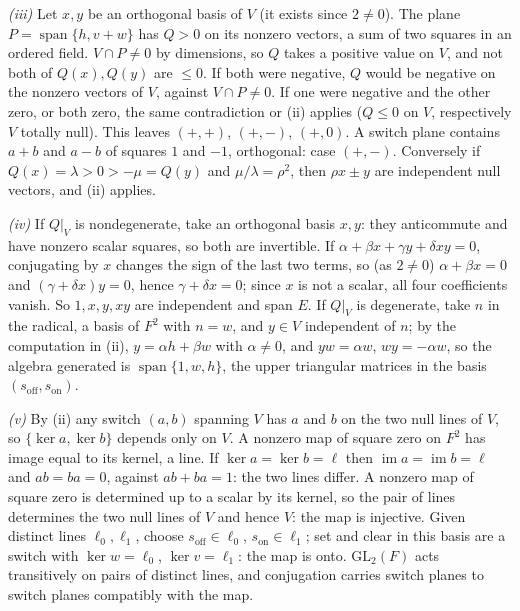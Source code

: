 \emph{(iii)} Let $x, y$ be an orthogonal basis of $V$ (it exists since $2 \ne 0$). The plane $P = \operatorname{span}\{h, v + w\}$ has $Q > 0$ on its nonzero vectors, a sum of two squares in an ordered field. $V \cap P \ne 0$ by dimensions, so $Q$ takes a positive value on $V$, and not both of $Q(x), Q(y)$ are $\le 0$. If both were negative, $Q$ would be negative on the nonzero vectors of $V$, against $V \cap P \ne 0$. If one were negative and the other zero, or both zero, the same contradiction or (ii) applies ($Q \le 0$ on $V$, respectively $V$ totally null). This leaves $(+,+)$, $(+,-)$, $(+,0)$. A switch plane contains $a + b$ and $a - b$ of squares $1$ and $-1$, orthogonal: case $(+,-)$. Conversely if $Q(x) = \lambda > 0 > -\mu = Q(y)$ and $\mu/\lambda = \rho^{2}$, then $\rho x \pm y$ are independent null vectors, and (ii) applies.

\emph{(iv)} If $Q|_{V}$ is nondegenerate, take an orthogonal basis $x, y$: they anticommute and have nonzero scalar squares, so both are invertible. If $\alpha + \beta x + \gamma y + \delta xy = 0$, conjugating by $x$ changes the sign of the last two terms, so (as $2 \ne 0$) $\alpha + \beta x = 0$ and $(\gamma + \delta x)y = 0$, hence $\gamma + \delta x = 0$; since $x$ is not a scalar, all four coefficients vanish. So $1, x, y, xy$ are independent and span $E$. If $Q|_{V}$ is degenerate, take $n$ in the radical, a basis of $F^{2}$ with $n = w$, and $y \in V$ independent of $n$; by the computation in (ii), $y = \alpha h + \beta w$ with $\alpha \ne 0$, and $yw = \alpha w$, $wy = -\alpha w$, so the algebra generated is $\operatorname{span}\{1, w, h\}$, the upper triangular matrices in the basis $(s_{\mathrm{off}}, s_{\mathrm{on}})$.

\emph{(v)} By (ii) any switch $(a, b)$ spanning $V$ has $a$ and $b$ on the two null lines of $V$, so $\{\ker a, \ker b\}$ depends only on $V$. A nonzero map of square zero on $F^{2}$ has image equal to its kernel, a line. If $\ker a = \ker b = \ell$ then $\operatorname{im}a = \operatorname{im}b = \ell$ and $ab = ba = 0$, against $ab + ba = 1$: the two lines differ. A nonzero map of square zero is determined up to a scalar by its kernel, so the pair of lines determines the two null lines of $V$ and hence $V$: the map is injective. Given distinct lines $\ell_{0}, \ell_{1}$, choose $s_{\mathrm{off}} \in \ell_{0}$, $s_{\mathrm{on}} \in \ell_{1}$; set and clear in this basis are a switch with $\ker w = \ell_{0}$, $\ker v = \ell_{1}$: the map is onto. $\mathrm{GL}_{2}(F)$ acts transitively on pairs of distinct lines, and conjugation carries switch planes to switch planes compatibly with the map.
